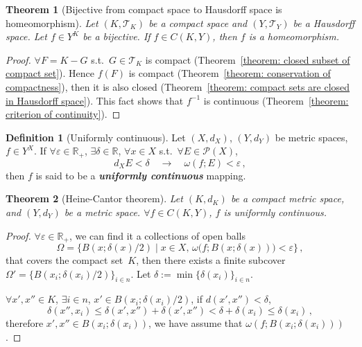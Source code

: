 \documentclass[openany]{book}
\newcommand*{\indexbf}[1]{\emph{\textbf{#1}}\index{#1}} %
\theoremstyle{plain}
\newtheorem{theorem}{Theorem}[section] %
\theoremstyle{definition}
\newtheorem{definition}{Definition}[section] %
\begin{document}
\begin{theorem}[Bijective from compact space to Hausdorff space is homeomorphism]
		\label{theorem: bijective from compact space to Hausdorff space is homeomorphism}
	Let $(K, \mathscr T_K)$ be a compact space and $(Y, \mathscr T_Y)$ be a Hausdorff space. 
	Let $f \in Y^K$ be a bijective.
	If $f \in C(K, Y)$, then $f$ is a homeomorphism.
\end{theorem}
\begin{proof}
	$\forall F = K - G$ s.t.\ $G \in \mathscr T_K$ is compact (Theorem~\ref{theorem: closed subset of compact set}). 
	Hence $f(F)$ is compact (Theorem~\ref{theorem: conservation of compactness}), then it is also closed
	(Theorem~\ref{theorem: compact sets are closed in Hausdorff space}). 
	This fact shows that $f^{-1}$ is continuous (Theorem~\ref{theorem: criterion of continuity}).
\end{proof}

\begin{definition}[Uniformly continuous]
	Let $(X, d_X)$, $(Y, d_Y)$ be metric spaces, $f \in Y^X$.
	If $\forall \varepsilon \in \mathbb R_+$, $\exists \delta \in \mathbb R$, $\forall x \in X$ s.t.\ $\forall E \in \mathscr P(X)$, 
	\begin{equation*}
		d_X E < \delta 
		\quad \to \quad
		\omega(f; E) < \varepsilon\,,
	\end{equation*}
	then $f$ is said to be a \indexbf{uniformly continuous} mapping.
\end{definition}

\begin{theorem}[Heine-Cantor theorem]
	\label{theorem: Heine-Cantor}
	Let $(K, d_K)$ be a compact metric space, and $(Y, d_Y)$ be a metric space.
	$\forall f \in C(K, Y)$, $f$ is uniformly continuous.
\end{theorem}
\begin{proof}
	$\forall \varepsilon \in \mathbb R_+$, we can find it a collections of open balls
	\begin{equation*}
		\varOmega = \big\{B(x; \delta(x)/2) \mid
			 x \in X,\, \omega\big(f; B(x; \delta(x))\big) < \varepsilon \big\}\,,
	\end{equation*}
	that covers the compact set~$K$, then there exists a finite subcover $\varOmega' = \big\{B(x_i; \delta(x_i)/2)\big\}_{i \in n}$. Let $\delta := \min \{\delta(x_i)\}_{i \in n}$.
	
	$\forall x', x'' \in K$, $\exists i \in n$, $x' \in B(x_i; \delta(x_i)/2)$, if $d(x', x'') < \delta$, 
	\begin{equation*}
		\delta(x'', x_i) \leq \delta(x', x'') + \delta(x', x'') < \delta + \delta(x_i) \leq \delta(x_i)\,,
	\end{equation*}
	therefore $x', x'' \in B(x_i; \delta(x_i))$, we have assume that $\omega(f; B(x_i; \delta(x_i)))$.
\end{proof}
\end{document}
